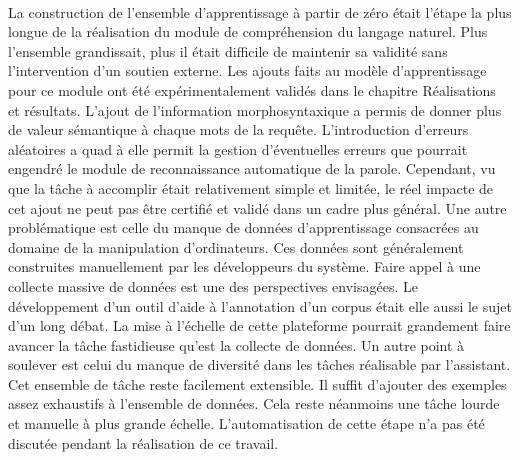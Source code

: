 \paragraph{}
La construction de l'ensemble d'apprentissage à partir de zéro était l'étape la plus longue de la réalisation du module de compréhension du langage naturel. Plus l'ensemble grandissait, plus il était difficile de maintenir sa validité sans l'intervention d'un soutien externe. Les ajouts faits au modèle d'apprentissage pour ce module ont été expérimentalement validés dans le chapitre Réalisations et résultats. L'ajout de l'information morphosyntaxique a permis de donner plus de valeur sémantique à chaque mots de la requête. L'introduction d'erreurs aléatoires a quad à elle permit la gestion d'éventuelles erreurs que pourrait engendré le module de reconnaissance automatique de la parole. Cependant, vu que la tâche à accomplir était relativement simple et limitée, le réel impacte de cet ajout ne peut pas être certifié et validé dans un cadre plus général. Une autre problématique est celle du manque de données d'apprentissage consacrées au domaine de la manipulation d'ordinateurs. Ces données sont généralement construites manuellement par les développeurs du système. Faire appel à une collecte massive de données est une des perspectives envisagées. Le développement d'un outil d'aide à l'annotation d'un corpus était elle aussi le sujet d'un long débat. La mise à l'échelle de cette plateforme pourrait grandement faire avancer la tâche fastidieuse qu'est la collecte de données. Un autre point à soulever est celui du manque de diversité dans les tâches réalisable par l'assistant. Cet ensemble de tâche reste facilement extensible. Il suffit d'ajouter des exemples assez exhaustifs à l'ensemble de données. Cela reste néanmoins une tâche lourde et manuelle à plus grande échelle. L'automatisation de cette étape n'a pas été discutée pendant la réalisation de ce travail.
